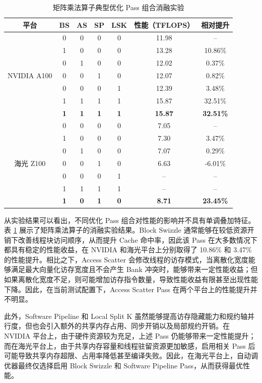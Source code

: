 \begin{table}[htbp]
\caption{矩阵乘法算子典型优化 Pass 组合消融实验}
\label{tab:matmul_pass_ablation}
\vspace{0.5em}\centering\wuhao
\begin{tabular}{ccccccc}
\toprule[1.5pt]
平台 & BS & AS & SP & LSK & 性能（TFLOPS） & 相对提升 \\
\midrule[1pt]
\multirow{7}{*}{NVIDIA A100}
& 0 & 0 & 0 & 0 & 11.98 & -- \\
& 1 & 0 & 0 & 0 & 13.28 & 10.86\% \\
& 0 & 1 & 0 & 0 & 12.02 & 0.37\% \\
& 0 & 0 & 1 & 0 & 12.07 & 0.82\% \\
& 0 & 0 & 0 & 1 & 12.39 & 3.48\% \\
& 1 & 1 & 1 & 1 & 15.87 & 32.51\% \\
& \textbf{1} & \textbf{1} & \textbf{1} & \textbf{1} & \textbf{15.87} & \textbf{32.51\%} \\
\multirow{7}{*}{海光 Z100}
& 0 & 0 & 0 & 0 & 7.05 & -- \\
& 1 & 0 & 0 & 0 & 7.30 & 3.47\% \\
& 0 & 1 & 0 & 0 & 7.07 & 0.29\% \\
& 0 & 0 & 1 & 0 & 6.63 & -6.01\% \\
& 0 & 0 & 0 & 1 & -- & -- \\
& 1 & 1 & 1 & 1 & -- & -- \\
& \textbf{1} & \textbf{0} & \textbf{1} & \textbf{0} & \textbf{8.71} & \textbf{23.45\%} \\
\bottomrule[1.5pt]
\end{tabular}
\vspace{\baselineskip}
\end{table}

从实验结果可以看出，不同优化 Pass 组合对性能的影响并不具有单调叠加特征。表 \ref{tab:matmul_pass_ablation} 展示了矩阵乘法算子的消融实验结果。Block Swizzle 通常能够在较低资源开销下改善线程块访问顺序，从而提升 Cache 命中率，因此该 Pass 在大多数情况下都具有稳定的性能收益，在 NVIDIA 和海光平台上分别取得了 10.86\% 和 3.47\% 的性能提升。相比之下，Access Scatter 会修改线程的访存模式，当离散化宽度能够满足最大向量化访存宽度且不会产生 Bank 冲突时，能够带来一定性能收益；但如果离散化宽度不足，则可能增加访存指令数量，导致性能收益有限甚至出现性能下降。因此，在当前测试配置下，Access Scatter Pass 在两个平台上的性能提升并不明显。

此外，Software Pipeline 和 Local Split K 虽然能够提高访存隐藏能力和规约轴并行度，但也会引入额外的共享内存占用、同步开销以及局部规约开销。在 NVIDIA 平台上，由于硬件资源较为充足，上述 Pass 仍能够带来一定性能提升；而在海光平台上，由于共享内存容量和线程驻留资源更加敏感，启用相关 Pass 后可能导致共享内存超限、占用率降低甚至编译失败。因此，在海光平台上，自动调优器最终仅选择启用 Block Swizzle 和 Software Pipeline Pass，从而获得最优性能。

